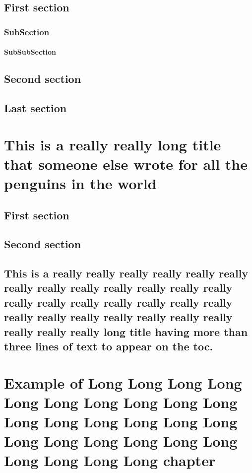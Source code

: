 \documentclass{mines-thesis}
\begin{document}
\section{First section} \lipsum[2-3]
\subsection{SubSection}\lipsum[1]
\subsubsection{SubSubSection}\lipsum[1]
\section{Second section} \lipsum[4-5]
\section{Last section} \lipsum[6-7]

\chapter{This is a really really long title that someone else wrote for all the penguins in the world}
\lipsum[1-2]
\section{First section} \lipsum[2-3]
\section{Second section} \lipsum[4-5]
\section{This is a really really really really really really really really really really really really really really really really really really really really really really really really really really really really really really long title having more than three lines of text to appear on the toc.}
\lipsum[1-2]

\lipsum[1-2]

\chapter{Example of Long  Long Long Long Long Long Long Long Long Long Long Long Long Long Long Long Long Long Long Long Long Long Long Long Long Long chapter}
\lipsum[1-10]
\end{document}
